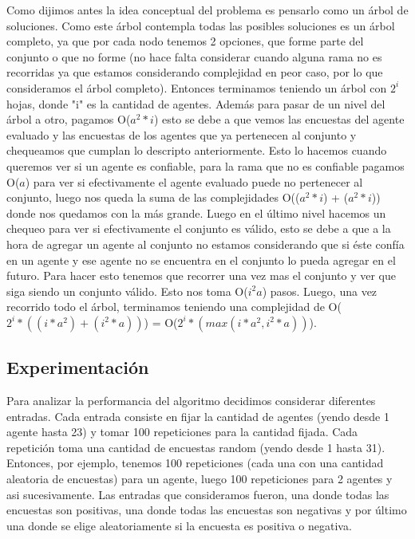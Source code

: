 	Como dijimos antes la idea conceptual del problema es pensarlo como un árbol de soluciones. Como este árbol contempla todas las posibles soluciones es un árbol completo, ya que por cada nodo tenemos 2 opciones, que forme parte del conjunto o que no forme (no hace falta considerar cuando alguna rama no es recorridas ya que estamos considerando complejidad en peor caso, por lo que  consideramos el árbol completo). Entonces terminamos teniendo un árbol con $2^{i}$ hojas, donde "i" es la cantidad de agentes. Además para pasar de un nivel del árbol a otro, pagamos O($a^{2}*i$) esto se debe a que vemos las encuestas del agente evaluado y las encuestas de los agentes que ya pertenecen al conjunto y chequeamos que cumplan lo descripto anteriormente. Esto lo hacemos cuando queremos ver si un agente es confiable, para la rama que no es confiable pagamos O($a$) para ver si efectivamente el agente evaluado puede no pertenecer al conjunto, luego nos queda la suma de las complejidades O(($a^{2}*i$) + ($a^{2}*i$)) donde nos quedamos con la más grande. Luego en el último nivel hacemos un chequeo para ver si efectivamente el conjunto es válido, esto se debe a que a la hora de agregar un agente al conjunto no estamos considerando que si éste confía en un agente y ese agente no se encuentra en el conjunto lo pueda agregar en el futuro. Para hacer esto tenemos que recorrer una vez mas el conjunto y ver que siga siendo un conjunto válido. Esto nos toma O($i^{2}a$) pasos. Luego, una vez recorrido todo el árbol, terminamos teniendo una complejidad de O($2^{i}*((i*a^{2})+(i^{2}*a))$) = O($2^{i}*(max(i*a^{2}, i^{2}*a))$).
	
\subsection{Experimentación} 
	
	Para analizar la performancia del algoritmo decidimos considerar diferentes entradas. Cada entrada consiste en fijar la cantidad de agentes (yendo desde 1 agente hasta 23) y tomar 100 repeticiones para la cantidad fijada. Cada repetición toma una cantidad de encuestas random (yendo desde 1 hasta 31). Entonces, por ejemplo, tenemos 100 repeticiones (cada una con una cantidad aleatoria de encuestas) para un agente, luego 100 repeticiones para 2 agentes y asi sucesivamente. Las entradas que consideramos fueron, una donde todas las encuestas son positivas, una donde todas las encuestas son negativas y por último una donde se elige aleatoriamente si la encuesta es positiva o negativa.       
	
